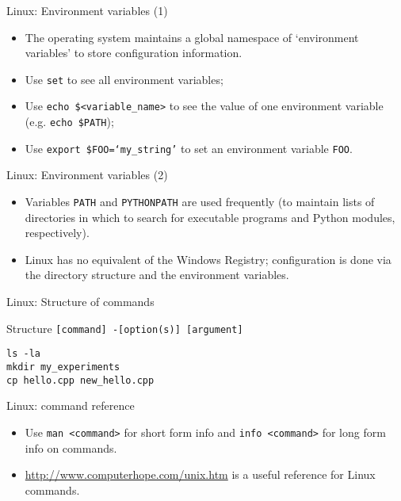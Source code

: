 \documentclass{beamer}
\newcommand{\command}[1]{\colorbox{light-gray}{\texttt{#1}}}
\begin{document}
\begin{frame}{Linux: Environment variables (1)}
  \begin{itemize}
    \item The operating system maintains a global namespace of `environment variables' to store configuration information.
    \item Use  \command{set} to see all environment variables;
    \item Use \command{echo \$<variable\_name>} to see the value of one environment variable (e.g. \command{echo \$PATH});
    \item Use \command{export \$FOO=`my\_string'} to set an environment variable \texttt{FOO}.
  \end{itemize}
\end{frame}

\begin{frame}{Linux: Environment variables (2)}
  \begin{itemize}
    \item Variables \texttt{PATH} and \texttt{PYTHONPATH} are used frequently (to maintain lists of directories in which to search for executable programs and Python modules, respectively).
    \item Linux has no equivalent of the Windows Registry; configuration is done via the directory structure and the environment variables.
  \end{itemize}
\end{frame}


\begin{frame}{Linux: Structure of commands}
  \begin{block}{Structure}
    \command{[command] -[option(s)] [argument]}
  \end{block}
  \begin{Examples}
     \command{ls -la} \\
     \command{mkdir my\_experiments} \\
     \command{cp hello.cpp new\_hello.cpp}
  \end{Examples}
\end{frame}


\begin{frame}{Linux: command reference}
  \begin{itemize}
  \item Use \command{man <command>} for short form info and \command{info <command>} for long form info on commands.
  \item \url{http://www.computerhope.com/unix.htm} is a useful reference for Linux commands.
\end{itemize}
\end{frame}
\end{document}
